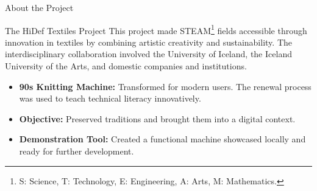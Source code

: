\documentclass[
    NAME={Dr. Helga Ingimundardóttir},
    EMAIL={helgaingim@hi.is},
    FACULTY={Industrial Engineering},
    TITLE={HiDef Textiles: Reviving Tradition with Innovation},
    SUBTITLE={Empowering Creativity and Sustainability in Textile Production through Digital Transformation},
    SEMINAR={Reykjavík DataBeers},
    DATE={January 25, 2025},
    WIDE={true}
]{HI-LaTeX/hi-beamer}
\begin{document}
    \begin{frame}{About the Project}

        \begin{block}{The HiDef Textiles Project}
            This project made STEAM\footnote{S: Science, T: Technology, E: Engineering, A: Arts, M: Mathematics.} fields accessible through innovation in textiles by combining artistic creativity and sustainability. The interdisciplinary collaboration involved the \alert{University of Iceland}, the \alert{Iceland University of the Arts}, and domestic companies and institutions.
        \end{block}

        \begin{itemize}
            \item \textbf{90s Knitting Machine:} Transformed for modern users. The renewal process was used to teach technical literacy innovatively.
            \item \textbf{Objective:} Preserved traditions and brought them into a digital context.
            \item \textbf{Demonstration Tool:} Created a functional machine showcased locally and ready for further development.
        \end{itemize}

    \end{frame}
\end{document}
